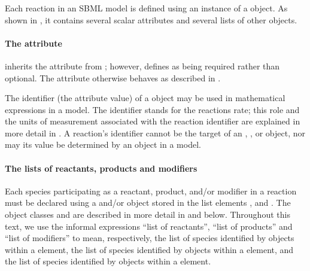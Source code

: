 \subsubsection{}
\label{sec:reaction-type}
\label{sec:listofreactants}
\label{sec:listofproducts}
\label{sec:listofmodifiers}

Each reaction in an SBML model is defined using an instance of a
\Reaction object.  As shown in , it
contains several scalar attributes and several lists of other
objects.


\begin{blockChanged}
\paragraph{The  attribute}

\Reaction inherits the  attribute from \SBase; however, \Reaction defines  as being required rather than optional.  The attribute otherwise behaves as described in .

The identifier (the  attribute value) of a \Reaction object may be used in mathematical expressions in a model.  The identifier stands for the reactions rate; this role and the units of measurement associated with the reaction identifier are explained in more detail in .  A reaction's identifier cannot be the target of an \InitialAssignment, \EventAssignment, or \Rule object, nor may its value be determined by an \AlgebraicRule object in a model.

\end{blockChanged}


\paragraph{The lists of reactants, products and modifiers}

Each species participating as a reactant, product, and/or modifier
in a reaction must be declared using a \SpeciesReference and/or
\ModifierSpeciesReference object stored in the list elements
,  and
.  The object classes \SpeciesReference and
\ModifierSpeciesReference are described in more detail in
and  below.  Throughout this text,
we use the informal expressions ``list of reactants'', ``list of
products'' and ``list of modifiers'' to mean, respectively, the
list of species identified by \SpeciesReference objects within a
\Reaction {} element, the list of species
identified by \SpeciesReference objects within a \Reaction
{} element, and the list of species identified
by \ModifierSpeciesReference objects within a \Reaction
{} element.


